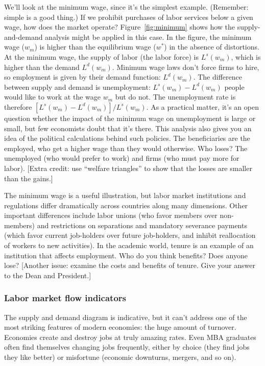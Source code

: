 \documentclass[letterpaper,12pt]{article}
\begin{document}
We'll look at the minimum wage, since it's the simplest example.
(Remember:  simple is a good thing.) 
If we prohibit purchases of labor services below a given wage, 
how does
the market operate?
Figure~\ref{fig:minimum} shows how the supply-and-demand analysis
might be applied in this case.  In the figure, the minimum wage
($w_{m}$) is higher than the equilibrium wage ($w^{*}$) in the
absence of distortions.  At the minimum wage, the supply of labor
(the labor force) is $L^{s}(w_{m})$, which is higher than the
demand $L^{d}(w_{m})$.  Minimum wage laws don't force firms to
hire, so employment is given by their demand function:
$L^{d}(w_{m})$.  The difference between supply and demand is
unemployment:  $L^{s}(w_{m})-L^{d}(w_{m})$ people would like to
work at the wage $w_{m}$ but do not.  The unemployment rate is
therefore $ [L^{s}(w_{m})-L^{d}(w_{m})]/L^{s}(w_{m})$.  As a
practical matter, it's an open question whether the impact of the
minimum wage on unemployment is large or small, but few economists
doubt that it's there.
This analysis also gives you an idea of the political calculations
behind such policies.  
The beneficiaries are the employed, 
who get a higher wage than they would otherwise.
Who loses?  The unemployed (who would prefer to work) 
and firms (who must pay more for labor).  
[Extra credit:  
use ``welfare triangles'' to show that the losses are smaller than the gains.]

The minimum wage is a useful illustration, 
but labor market institutions and regulations 
differ dramatically across countries along many dimensions.
Other important differences include labor unions (who favor members over non-members) and 
restrictions on separations and mandatory severance payments (which favor current job-holders over future job-holders, 
and inhibit reallocation of workers to new activities).  
In the academic world, tenure is an example of an institution
that affects employment.  
Who do you think benefits?  Does anyone lose?  
[Another issue:  examine the costs and benefits of tenure.
Give your answer to the Dean and President.]


\subsubsection*{Labor market flow indicators}

The supply and demand diagram is indicative, 
but it can't address one of the most striking features of 
modern economies:
the huge amount of turnover.
Economies create and destroy jobs at truly amazing rates.
Even MBA graduates often find themselves changing jobs 
frequently, either by choice (they find jobs they like better) 
or misfortune (economic downturns, mergers, and so on).  
\end{document}
